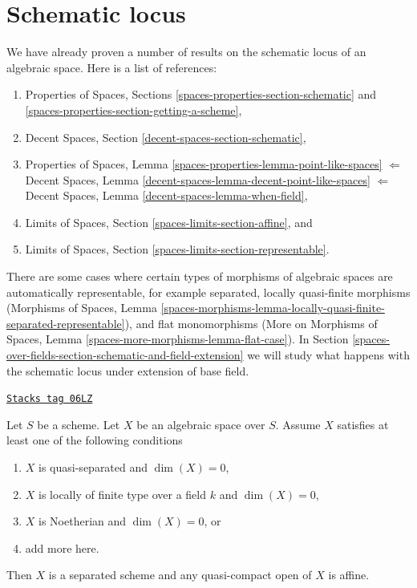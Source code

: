 \section{Schematic locus}
\label{spaces-over-fields-section-schematic}
We have already proven a number of results on the schematic locus
of an algebraic space. Here is a list of references:
\begin{enumerate}
\item Properties of Spaces, Sections
\ref{spaces-properties-section-schematic} and
\ref{spaces-properties-section-getting-a-scheme},
\item Decent Spaces, Section \ref{decent-spaces-section-schematic},
\item Properties of Spaces, Lemma
\ref{spaces-properties-lemma-point-like-spaces}
$\Leftarrow$
Decent Spaces, Lemma \ref{decent-spaces-lemma-decent-point-like-spaces}
$\Leftarrow$
Decent Spaces, Lemma \ref{decent-spaces-lemma-when-field},
\item Limits of Spaces, Section \ref{spaces-limits-section-affine}, and
\item Limits of Spaces, Section \ref{spaces-limits-section-representable}.
\end{enumerate}
There are some cases where certain types of morphisms of algebraic spaces
are automatically representable, for example
separated, locally quasi-finite morphisms (Morphisms of Spaces, Lemma
\ref{spaces-morphisms-lemma-locally-quasi-finite-separated-representable}),
and flat monomorphisms (More on Morphisms of Spaces, Lemma
\ref{spaces-more-morphisms-lemma-flat-case}).
In Section \ref{spaces-over-fields-section-schematic-and-field-extension}
we will study what happens with the schematic
locus under extension of base field.

\begin{lemma}
\label{spaces-over-fields-lemma-locally-finite-type-dim-zero}
\href{https://stacks.math.columbia.edu/tag/06LZ}{\texttt{Stacks tag 06LZ}}

Let $S$ be a scheme. Let $X$ be an algebraic space over $S$.
Assume $X$ satisfies at least one of the following conditions
\begin{enumerate}
\item $X$ is quasi-separated and $\dim(X) = 0$,
\item $X$ is locally of finite type over a field $k$ and $\dim(X) = 0$,
\item $X$ is Noetherian and $\dim(X) = 0$, or
\item add more here.
\end{enumerate}
Then $X$ is a separated scheme and any quasi-compact open of $X$ is affine.
\end{lemma}

